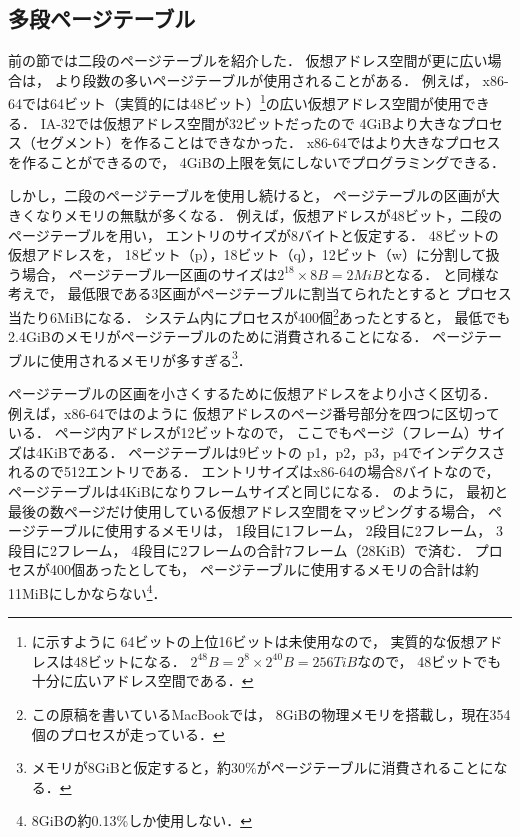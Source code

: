 \subsection{多段ページテーブル}
前の節では二段のページテーブルを紹介した．
仮想アドレス空間が更に広い場合は，
より段数の多いページテーブルが使用されることがある．
例えば，
x86-64では64ビット（実質的には48ビット）\footnote{
  に示すように
  64ビットの上位16ビットは未使用なので，
  実質的な仮想アドレスは48ビットになる．
  $2^{48}B = 2^8 \times 2^{40}B = 256TiB$なので，
  48ビットでも十分に広いアドレス空間である．
}の広い仮想アドレス空間が使用できる．
IA-32では仮想アドレス空間が32ビットだったので
4GiBより大きなプロセス（セグメント）を作ることはできなかった．
x86-64ではより大きなプロセスを作ることができるので，
4GiBの上限を気にしないでプログラミングできる．

しかし，二段のページテーブルを使用し続けると，
ページテーブルの区画が大きくなりメモリの無駄が多くなる．
例えば，仮想アドレスが48ビット，二段のページテーブルを用い，
エントリのサイズが8バイトと仮定する．
48ビットの仮想アドレスを，
18ビット（p），18ビット（q），12ビット（w）に分割して扱う場合，
ページテーブル一区画のサイズは$2^{18} \times 8B = 2MiB$となる．
と同様な考えで，
最低限である3区画がページテーブルに割当てられたとすると
プロセス当たり6MiBになる．
システム内にプロセスが400個\footnote{
  この原稿を書いているMacBookでは，
  8GiBの物理メモリを搭載し，現在354個のプロセスが走っている．
}あったとすると，
最低でも2.4GiBのメモリがページテーブルのために消費されることになる．
ページテーブルに使用されるメモリが多すぎる\footnote{
  メモリが8GiBと仮定すると，約30\%がページテーブルに消費されることになる．
}．

ページテーブルの区画を小さくするために仮想アドレスをより小さく区切る．
例えば，x86-64ではのように
仮想アドレスのページ番号部分を四つに区切っている．
ページ内アドレスが12ビットなので，
ここでもページ（フレーム）サイズは4KiBである．
ページテーブルは9ビットの
p1，p2，p3，p4でインデクスされるので512エントリである．
エントリサイズはx86-64の場合8バイトなので，
ページテーブルは4KiBになりフレームサイズと同じになる．
のように，
最初と最後の数ページだけ使用している仮想アドレス空間をマッピングする場合，
ページテーブルに使用するメモリは，
1段目に1フレーム，
2段目に2フレーム，
3段目に2フレーム，
4段目に2フレームの合計7フレーム（28KiB）で済む．
プロセスが400個あったとしても，
ページテーブルに使用するメモリの合計は約11MiBにしかならない\footnote{
  8GiBの約0.13\%しか使用しない．}．

